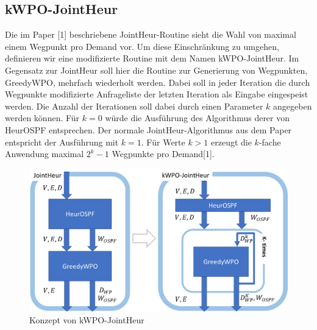 \documentclass[sigconf,noacm,review]{acmart}
\begin{document}
\subsection{kWPO-JointHeur}
Die im Paper [1] beschriebene JointHeur-Routine sieht die Wahl von maximal einem Wegpunkt pro Demand vor. Um diese Einschränkung zu umgehen, definieren wir eine modifizierte Routine mit dem Namen kWPO-JointHeur. Im Gegensatz zur JointHeur soll hier die Routine zur Generierung von Wegpunkten, GreedyWPO, mehrfach wiederholt werden. Dabei soll in jeder Iteration die durch Wegpunkte modifizierte Anfrageliste der letzten Iteration als Eingabe eingespeist werden. 
Die Anzahl der Iterationen soll dabei durch einen Parameter $k$ angegeben werden können. Für $k = 0$ würde die Ausführung des Algorithmus derer von HeurOSPF entsprechen. Der normale JointHeur-Algorithmus aus dem Paper entspricht der Ausführung mit $k=1$. Für Werte $k > 1$ erzeugt die $k$-fache Anwendung maximal $2^{k}-1$ Wegpunkte pro Demand[1].
\begin{figure}[h]
  \centering 
  \includegraphics[width=\linewidth]{abbildungen/kWPO_Concept.png}
  \caption{Konzept von kWPO-JointHeur}
\end{figure}
\end{document}
